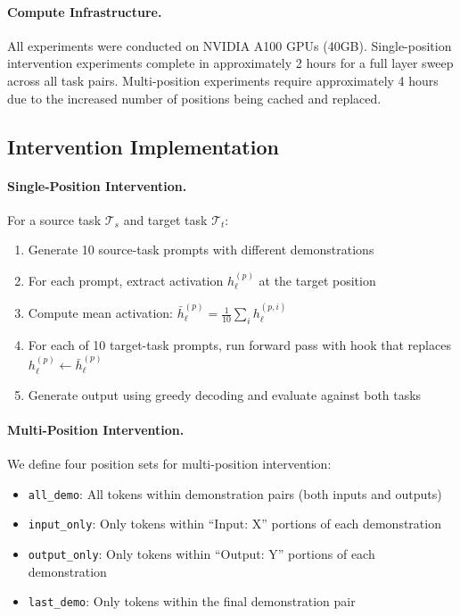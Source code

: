 \documentclass{article}
\begin{document}
\paragraph{Compute Infrastructure.} All experiments were conducted on NVIDIA A100 GPUs (40GB). Single-position intervention experiments complete in approximately 2 hours for a full layer sweep across all task pairs. Multi-position experiments require approximately 4 hours due to the increased number of positions being cached and replaced.

\subsection{Intervention Implementation}

\paragraph{Single-Position Intervention.} For a source task $\mathcal{T}_s$ and target task $\mathcal{T}_t$:
\begin{enumerate}
    \item Generate 10 source-task prompts with different demonstrations
    \item For each prompt, extract activation $h_\ell^{(p)}$ at the target position
    \item Compute mean activation: $\bar{h}_\ell^{(p)} = \frac{1}{10}\sum_i h_\ell^{(p,i)}$
    \item For each of 10 target-task prompts, run forward pass with hook that replaces $h_\ell^{(p)} \leftarrow \bar{h}_\ell^{(p)}$
    \item Generate output using greedy decoding and evaluate against both tasks
\end{enumerate}

\paragraph{Multi-Position Intervention.} We define four position sets for multi-position intervention:
\begin{itemize}
    \item \texttt{all\_demo}: All tokens within demonstration pairs (both inputs and outputs)
    \item \texttt{input\_only}: Only tokens within ``Input: X'' portions of each demonstration
    \item \texttt{output\_only}: Only tokens within ``Output: Y'' portions of each demonstration
    \item \texttt{last\_demo}: Only tokens within the final demonstration pair
\end{itemize}
\end{document}

